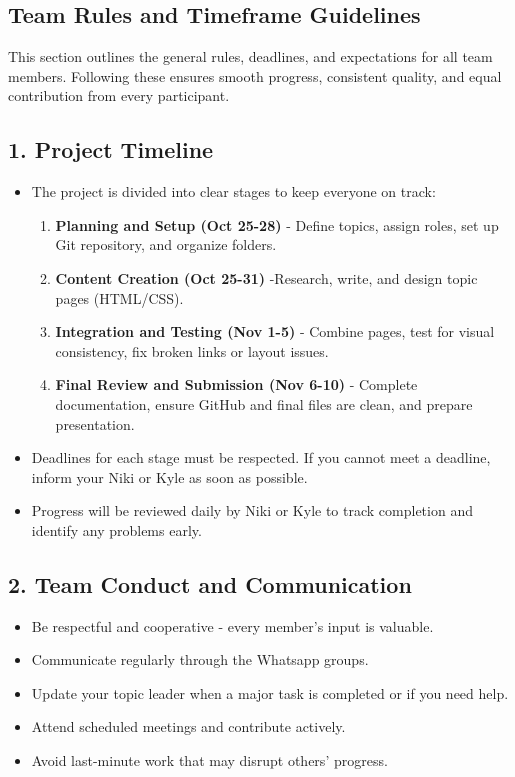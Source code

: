 \documentclass[a4paper,12pt]{article}
\begin{document}
\begin{itemize}[leftmargin=1.2cm]
\newpage
\section*{Team Rules and Timeframe Guidelines}

\noindent
This section outlines the general rules, deadlines, and expectations for all team members.  
Following these ensures smooth progress, consistent quality, and equal contribution from every participant.

\vspace{0.5cm}
\subsection*{1. Project Timeline}
\begin{itemize}[leftmargin=1.2cm]
    \item The project is divided into clear stages to keep everyone on track:
    \begin{enumerate}[label=\arabic*., leftmargin=1.2cm]
        \item \textbf{Planning and Setup (Oct 25-28)} - Define topics, assign roles, set up Git repository, and organize folders.  
        \item \textbf{Content Creation (Oct 25-31)} -Research, write, and design topic pages (HTML/CSS).  
        \item \textbf{Integration and Testing (Nov 1-5)} - Combine pages, test for visual consistency, fix broken links or layout issues.  
        \item \textbf{Final Review and Submission (Nov 6-10)} - Complete documentation, ensure GitHub and final files are clean, and prepare presentation.
    \end{enumerate}
    \item Deadlines for each stage must be respected. If you cannot meet a deadline, inform your Niki or Kyle as soon as possible.
    \item Progress will be reviewed daily by Niki or Kyle to track completion and identify any problems early.
\end{itemize}

\vspace{0.3cm}
\subsection*{2. Team Conduct and Communication}
\begin{itemize}[leftmargin=1.2cm]
    \item Be respectful and cooperative - every member’s input is valuable.
    \item Communicate regularly through the Whatsapp groups.
    \item Update your topic leader when a major task is completed or if you need help.
    \item Attend scheduled meetings and contribute actively.
    \item Avoid last-minute work that may disrupt others’ progress.
\end{itemize}


\end{itemize}
\end{document}

